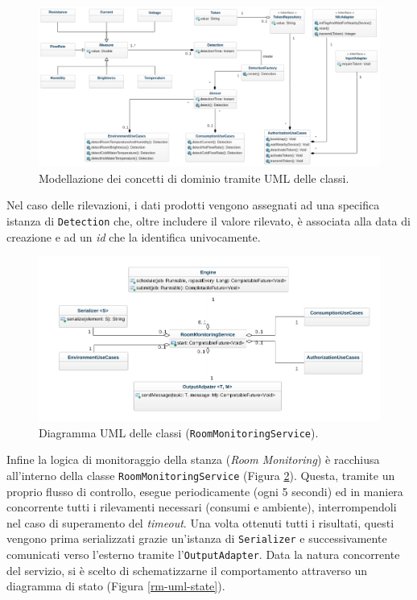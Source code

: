 \begin{figure}[H]
    \centering
    \includegraphics[width=\textwidth]{images/cu-uml.png}\hfill
    \caption{\label{cu-uml}Modellazione dei concetti di dominio tramite UML delle classi.}
\end{figure}
Nel caso delle rilevazioni, i dati prodotti vengono assegnati ad una specifica istanza di \texttt{Detection} che, oltre includere il valore rilevato, è associata alla data di creazione e ad un \textit{id} che la identifica univocamente. 
%
\begin{figure}[H]
    \centering
    \includegraphics[width=\textwidth]{images/room-monitoring-serivce.png}\hfill
    \caption{\label{rm-uml}Diagramma UML delle classi (\texttt{RoomMonitoringService}).}
\end{figure}
%
Infine la logica di monitoraggio della stanza (\textit{Room Monitoring}) è racchiusa all'interno della classe \texttt{RoomMonitoringService} (Figura \ref*{rm-uml}). Questa, tramite un proprio flusso di controllo, esegue periodicamente (ogni 5 secondi) ed in maniera concorrente tutti i rilevamenti necessari (consumi e ambiente), interrompendoli nel caso di superamento del \textit{timeout}. Una volta ottenuti tutti i risultati, questi vengono prima serializzati grazie un'istanza di \texttt{Serializer} e successivamente comunicati verso l'esterno tramite l'\texttt{OutputAdapter}. Data la natura concorrente del servizio, si è scelto di schematizzarne il comportamento attraverso un diagramma di stato (Figura \ref*{rm-uml-state}).

